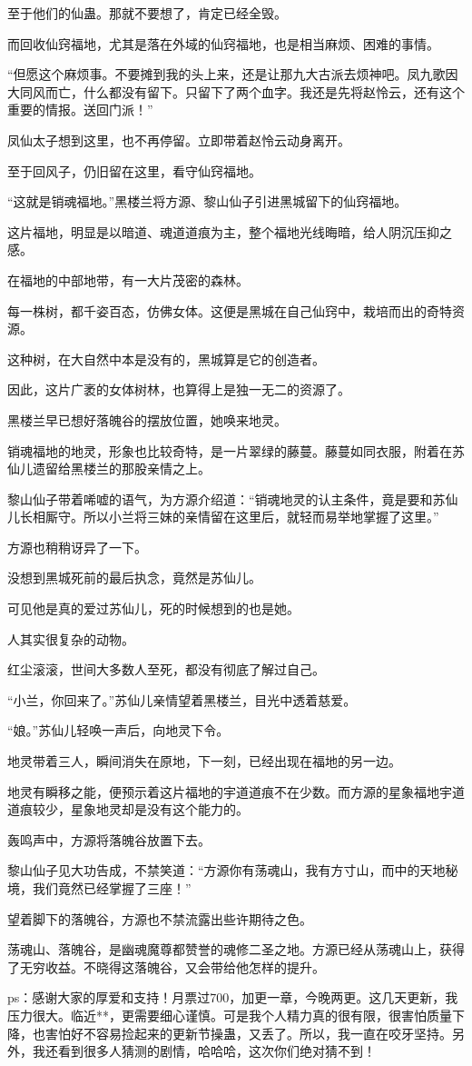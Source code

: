 \begin{this_body}
至于他们的仙蛊。那就不要想了，肯定已经全毁。

而回收仙窍福地，尤其是落在外域的仙窍福地，也是相当麻烦、困难的事情。

“但愿这个麻烦事。不要摊到我的头上来，还是让那九大古派去烦神吧。凤九歌因大同风而亡，什么都没有留下。只留下了两个血字。我还是先将赵怜云，还有这个重要的情报。送回门派！”

凤仙太子想到这里，也不再停留。立即带着赵怜云动身离开。

至于回风子，仍旧留在这里，看守仙窍福地。

“这就是销魂福地。”黑楼兰将方源、黎山仙子引进黑城留下的仙窍福地。

这片福地，明显是以暗道、魂道道痕为主，整个福地光线晦暗，给人阴沉压抑之感。

在福地的中部地带，有一大片茂密的森林。

每一株树，都千姿百态，仿佛女体。这便是黑城在自己仙窍中，栽培而出的奇特资源。

这种树，在大自然中本是没有的，黑城算是它的创造者。

因此，这片广袤的女体树林，也算得上是独一无二的资源了。

黑楼兰早已想好落魄谷的摆放位置，她唤来地灵。

销魂福地的地灵，形象也比较奇特，是一片翠绿的藤蔓。藤蔓如同衣服，附着在苏仙儿遗留给黑楼兰的那股亲情之上。

黎山仙子带着唏嘘的语气，为方源介绍道：“销魂地灵的认主条件，竟是要和苏仙儿长相厮守。所以小兰将三妹的亲情留在这里后，就轻而易举地掌握了这里。”

方源也稍稍讶异了一下。

没想到黑城死前的最后执念，竟然是苏仙儿。

可见他是真的爱过苏仙儿，死的时候想到的也是她。

人其实很复杂的动物。

红尘滚滚，世间大多数人至死，都没有彻底了解过自己。

“小兰，你回来了。”苏仙儿亲情望着黑楼兰，目光中透着慈爱。

“娘。”苏仙儿轻唤一声后，向地灵下令。

地灵带着三人，瞬间消失在原地，下一刻，已经出现在福地的另一边。

地灵有瞬移之能，便预示着这片福地的宇道道痕不在少数。而方源的星象福地宇道道痕较少，星象地灵却是没有这个能力的。

轰鸣声中，方源将落魄谷放置下去。

黎山仙子见大功告成，不禁笑道：“方源你有荡魂山，我有方寸山，而中的天地秘境，我们竟然已经掌握了三座！”

望着脚下的落魄谷，方源也不禁流露出些许期待之色。

荡魂山、落魄谷，是幽魂魔尊都赞誉的魂修二圣之地。方源已经从荡魂山上，获得了无穷收益。不晓得这落魄谷，又会带给他怎样的提升。

ps：感谢大家的厚爱和支持！月票过700，加更一章，今晚两更。这几天更新，我压力很大。临近**，更需要细心谨慎。可是我个人精力真的很有限，很害怕质量下降，也害怕好不容易捡起来的更新节操蛊，又丢了。所以，我一直在咬牙坚持。另外，我还看到很多人猜测的剧情，哈哈哈，这次你们绝对猜不到！

\end{this_body}

